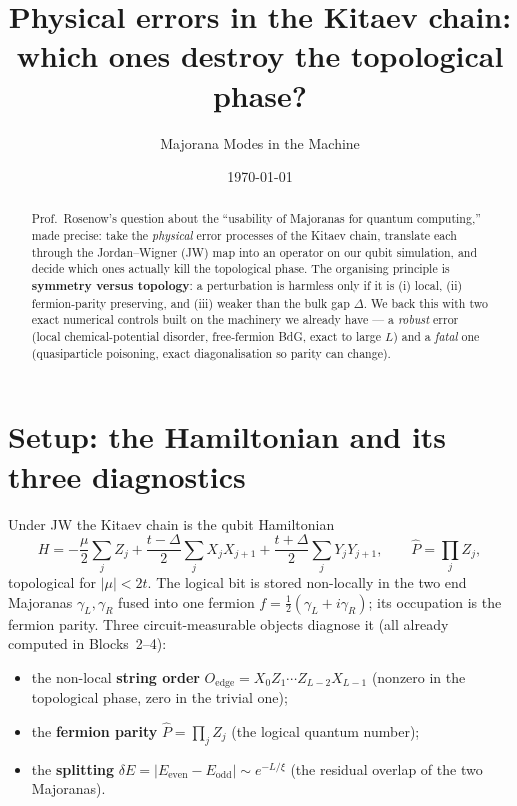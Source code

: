 \documentclass[11pt]{article}
\title{Physical errors in the Kitaev chain:\\ which ones destroy the topological phase?}
\author{Majorana Modes in the Machine}
\date{\today}
\newcommand{\Oedge}{X_0 Z_1\cdots Z_{L-2} X_{L-1}}
\newcommand{\Pop}{\hat{P}}
\begin{document}
\maketitle

\begin{abstract}
Prof.\ Rosenow's question about the ``usability of Majoranas for quantum
computing,'' made precise: take the \emph{physical} error processes of the Kitaev
chain, translate each through the Jordan--Wigner (JW) map into an operator on our
qubit simulation, and decide which ones actually kill the topological phase. The
organising principle is \textbf{symmetry versus topology}: a perturbation is
harmless only if it is (i) local, (ii) fermion-parity preserving, and (iii)
weaker than the bulk gap $\Delta$. We back this with two exact numerical controls
built on the machinery we already have --- a \emph{robust} error (local
chemical-potential disorder, free-fermion BdG, exact to large $L$) and a
\emph{fatal} one (quasiparticle poisoning, exact diagonalisation so parity can
change).
\end{abstract}

\section{Setup: the Hamiltonian and its three diagnostics}
Under JW the Kitaev chain is the qubit Hamiltonian
\begin{equation}
  H = -\frac{\mu}{2}\sum_j Z_j
      + \frac{t-\Delta}{2}\sum_j X_jX_{j+1}
      + \frac{t+\Delta}{2}\sum_j Y_jY_{j+1},
  \qquad \Pop=\prod_j Z_j,
\end{equation}
topological for $|\mu|<2t$. The logical bit is stored non-locally in the two end
Majoranas $\gamma_L,\gamma_R$ fused into one fermion $f=\tfrac12(\gamma_L+i\gamma_R)$;
its occupation is the fermion parity. Three circuit-measurable objects diagnose it
(all already computed in Blocks~2--4):
\begin{itemize}
  \item the non-local \textbf{string order} $O_{\mathrm{edge}}=\Oedge$ (nonzero in
        the topological phase, zero in the trivial one);
  \item the \textbf{fermion parity} $\Pop=\prod_j Z_j$ (the logical quantum number);
  \item the \textbf{splitting} $\delta E=|E_{\mathrm{even}}-E_{\mathrm{odd}}|\sim
        e^{-L/\xi}$ (the residual overlap of the two Majoranas).
\end{itemize}
\end{document}
